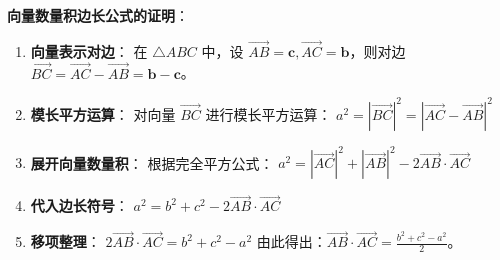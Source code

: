 \begin{proofbox}
\textbf{向量数量积边长公式的证明}：
\begin{enumerate}
    \item \textbf{向量表示对边}：
    在 $\triangle ABC$ 中，设 $\vec{AB} = \mathbf{c}, \vec{AC} = \mathbf{b}$，则对边 $\vec{BC} = \vec{AC} - \vec{AB} = \mathbf{b} - \mathbf{c}$。
    
    \item \textbf{模长平方运算}：
    对向量 $\vec{BC}$ 进行模长平方运算：
    $a^2 = |\vec{BC}|^2 = |\vec{AC} - \vec{AB}|^2$
    
    \item \textbf{展开向量数量积}：
    根据完全平方公式：
    $a^2 = |\vec{AC}|^2 + |\vec{AB}|^2 - 2\vec{AB} \cdot \vec{AC}$
    
    \item \textbf{代入边长符号}：
    $a^2 = b^2 + c^2 - 2\vec{AB} \cdot \vec{AC}$
    
    \item \textbf{移项整理}：
    $2\vec{AB} \cdot \vec{AC} = b^2 + c^2 - a^2$
    由此得出：$\vec{AB} \cdot \vec{AC} = \frac{b^2 + c^2 - a^2}{2}$。
\end{enumerate}
\end{proofbox}